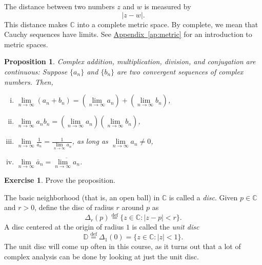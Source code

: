 \documentclass[12pt,openany]{book}
\newcommand{\glsadd}[2][]{}
\newcommand{\sabs}[1]{\lvert {#1} \rvert}
\newcommand{\C}{{\mathbb{C}}}
\newcommand{\D}{{\mathbb{D}}}
\newcommand{\myindex}[1]{#1\index{#1}}
\theoremstyle{plain}
\newtheorem{prop}[thm]{Proposition}
\theoremstyle{remark}
\theoremstyle{definition}
\newenvironment{exbox}{%
    \def\FrameCommand{\vrule width 1pt \relax\hspace{10pt}}%
    \MakeFramed{\advance\hsize-\width\FrameRestore}%
}{%
    \endMakeFramed
}
\theoremstyle{exercise}
\newtheorem{exercise}{Exercise}[section]
\theoremstyle{example}
\newcommand{\Appendixref}[1]{\hyperref[#1]{Appendix~\ref*{#1}}}
\begin{document}
The distance between two numbers $z$ and $w$ is measured by
\begin{equation*}
\sabs{z-w} .
\end{equation*}
This distance makes $\C$ into a complete metric space.  By complete, we mean that
Cauchy sequences have limits.  See \Appendixref{ap:metric}
for an introduction to metric spaces.

\begin{prop}
Complex addition, multiplication, division, and conjugation are continuous:
Suppose $\{ a_n \}$ and $\{ b_n \}$ are two convergent sequences
of complex numbers.  Then,
\begin{enumerate}[(i)]
\item
$\lim\limits_{n\to\infty} (a_n + b_n) = 
\left(\lim\limits_{n\to\infty} a_n \right) +
\left(\lim\limits_{n\to\infty} b_n \right)$,
\item
$\lim\limits_{n\to\infty} a_n b_n = 
\left(\lim\limits_{n\to\infty} a_n \right)
\left(\lim\limits_{n\to\infty} b_n \right)$,
\item
$\lim\limits_{n\to\infty} \frac{1}{a_n} = \frac{1}{\lim\limits_{n\to\infty} a_n}$,
as long as $\lim\limits_{n\to\infty} a_n \neq 0$,
\item
$\lim\limits_{n\to\infty} \bar{a}_n = 
\overline{\lim\limits_{n\to\infty} a_n}$.
\end{enumerate}
\end{prop}

\begin{exbox}
\begin{exercise}%
Prove the proposition.
\end{exercise}
\end{exbox}

The basic neighborhood (that is, an
open ball) in $\C$
is called a \emph{\myindex{disc}}.
Given $p \in \C$ and $r > 0$, define the disc of radius $r$ around
$p$
as
\glsadd{not:disc}%
\begin{equation*}
\Delta_r(p)
\overset{\text{def}}{=}
\bigl\{ z \in \C : \sabs{z-p} < r \bigr\} .
\end{equation*}
A disc centered at the origin of radius $1$ is called the
\emph{\myindex{unit disc}}
\glsadd{not:D}%
\begin{equation*}
\D
\overset{\text{def}}{=}
\Delta_1(0)
=
\bigl\{ z \in \C : \sabs{z} < 1 \bigr\} .
\end{equation*}
The unit disc will come up often in this course, as it turns out that
a lot of complex analysis can be done by looking at just the unit disc.
\end{document}
